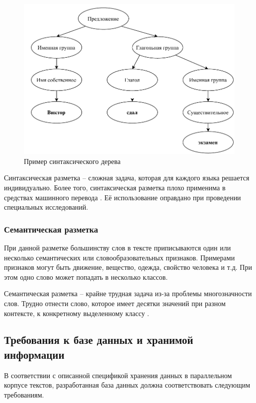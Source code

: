 \begin{figure}[ht]
	\centering
	\includegraphics[width=\textwidth]{img/syn-tree.pdf}
	\caption{Пример синтаксического дерева}
	\label{syn-tree}
\end{figure}

Синтаксическая разметка -- сложная задача, которая для каждого языка решается индивидуально.
Более того, синтаксическая разметка плохо применима в средствах машинного перевода \cite{poibeau-MT-2017}. 
Её использование оправдано при проведении специальных исследований. 

\subsubsection{Семантическая разметка}

При данной разметке большинству слов в тексте приписываются один или несколько семантических или словообразовательных признаков. 
Примерами признаков могут быть движение, вещество, одежда, свойство человека и т.д. 
При этом одно слово может попадать в несколько классов.

Семантическая разметка -- крайне трудная задача из-за проблемы многозначности слов. 
Трудно отнести слово, которое имеет десятки значений при разном контексте, к конкретному выделенному классу \cite{annotation-russian}.

\subsection{Требования к базе данных и хранимой информации}

В соответствии с описанной спецификой хранения данных в параллельном корпусе текстов, разработанная база данных должна соответствовать следующим требованиям.

